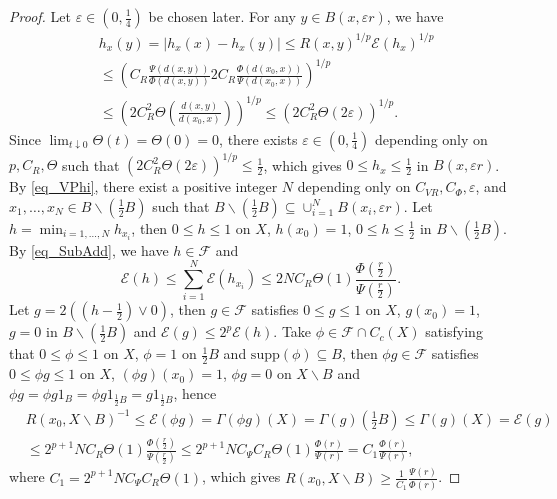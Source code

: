 \documentclass[11pt,a4paper]{article}
\numberwithin{equation}{section}
\theoremstyle{plain}
\theoremstyle{definition}
\begin{document}
\begin{proof}
Let $\varepsilon\in(0,\frac{1}{4})$ be chosen later. For any $y\in B(x,\varepsilon r)$, we have
\begin{align*}
&h_x(y)=|h_x(x)-h_x(y)|\le R(x,y)^{1/p}\mathcal{E}(h_x)^{1/p}\\
&\le \left(C_R \frac{\Psi(d(x,y))}{\Phi(d(x,y))}2C_R\frac{\Phi(d(x_0,x))}{\Psi(d(x_0,x))}\right)^{1/p}\\
&\le \left(2C_R^2\Theta \left(\frac{d(x,y)}{d(x_0,x)}\right)\right)^{1/p}\le\left(2C_R^2\Theta \left(2\varepsilon\right)\right)^{1/p}.
\end{align*}
Since $\lim_{t\downarrow0}\Theta(t)=\Theta(0)=0$, there exists $\varepsilon\in(0,\frac{1}{4})$ depending only on $p, C_R, \Theta$ such that $\left(2C_R^2\Theta(2\varepsilon)\right)^{1/p}\le \frac{1}{2}$, which gives $0\le h_x\le \frac{1}{2}$ in $B(x,\varepsilon r)$. By \ref{eq_VPhi}, there exist a positive integer $N$ depending only on $C_{VR}, C_\Phi, \varepsilon$, and $x_1,\ldots,x_N\in B\backslash(\frac{1}{2}B)$ such that $B\backslash(\frac{1}{2}B)\subseteq\cup_{i=1}^NB(x_i,\varepsilon r)$. Let $h=\min_{i=1,\ldots,N}h_{x_i}$, then $0\le h\le 1$ on $X$, $h(x_0)=1$, $0\le h\le \frac{1}{2}$ in $B\backslash(\frac{1}{2}B)$. By \ref{eq_SubAdd}, we have $h\in\mathcal{F}$ and
$$\mathcal{E}(h)\le\sum_{i=1}^N\mathcal{E}(h_{x_i})\le2NC_R\Theta(1)\frac{\Phi(\frac{r}{2})}{\Psi(\frac{r}{2})}.$$
Let $g=2((h-\frac{1}{2})\vee0)$, then $g\in\mathcal{F}$ satisfies $0\le g\le 1$ on $X$, $g(x_0)=1$, $g=0$ in $B\backslash(\frac{1}{2}B)$ and $\mathcal{E}(g)\le2^p\mathcal{E}(h)$. Take $\phi\in\mathcal{F}\cap C_c(X)$ satisfying that $0\le\phi\le 1$ on $X$, $\phi=1$ on $\frac{1}{2}B$ and $\mathrm{supp}(\phi)\subseteq B$, then $\phi g\in\mathcal{F}$ satisfies $0\le\phi g\le 1$ on $X$, $(\phi g)(x_0)=1$, $\phi g=0$ on $X\backslash B$ and $\phi g=\phi g1_B=\phi g1_{\frac{1}{2}B}=g1_{\frac{1}{2}B}$, hence
\begin{align*}
&R(x_0,X\backslash B)^{-1}\le\mathcal{E}(\phi g)=\Gamma(\phi g)(X)=\Gamma(g)(\frac{1}{2}B)\le\Gamma(g)(X)=\mathcal{E}(g)\\
&\le 2^{p+1}NC_R\Theta(1)\frac{\Phi(\frac{r}{2})}{\Psi(\frac{r}{2})}\le 2^{p+1}NC_\Psi C_R\Theta(1)\frac{\Phi(r)}{\Psi(r)}=C_1\frac{\Phi(r)}{\Psi(r)},
\end{align*}
where $C_1=2^{p+1}NC_\Psi C_R\Theta(1)$, which gives $R(x_0,X\backslash B)\ge \frac{1}{C_1}\frac{\Psi(r)}{\Phi(r)}$.


\end{proof}
\end{document}
